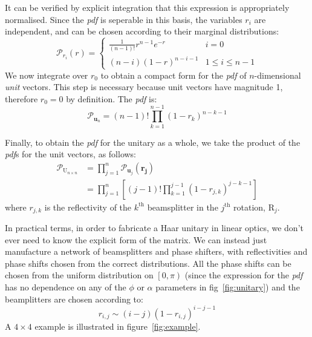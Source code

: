 \documentclass[aps,prl,twocolumn]{revtex4}
\renewcommand{\vec}[1]{\mathbf{#1}}
\newcommand{\mat}[1]{\mathrm{#1}}
\newcommand{\by}{\times}
\newcommand{\of}[1]{\!\left(#1\right)}
\newcommand{\pdf}{{\it pdf}}
\newcommand{\prob}[1]{\mathcal{#1}}
\begin{document}
It can be verified by explicit integration that this expression is appropriately
normalised. Since the \pdf{ } is seperable in this basis, the variables \( r_i
\) are independent, and can be chosen according to their marginal distributions:
\begin{equation}
  \prob{P}_{r_i} \of{ r } = \left\{ \begin{matrix}
    \frac{1}{ \left( n-1 \right)! } r^{n-1} e^{-r} & i=0 \\
    \left( n-i \right) \left( 1-r \right)^{n-i-1} & 1 \leq i \leq n-1
  \end{matrix} \right.
\end{equation}
We now integrate over \(r_{0}\) to obtain a compact form for the \pdf{ } of
\(n\)-dimensional \emph{unit} vectors. This step is necessary because unit
vectors have magnitude 1, therefore \(r_0=0\) by definition. The \pdf{ } is:
\begin{equation}
  \prob{P}_{ \vec{u}_n } = \left( n-1 \right)! \prod_{k=1}^{n-1} \left( 1-r_k
  \right)^{n-k-1}
\end{equation}

Finally, to obtain the \pdf{ } for the unitary as a whole, we take the product
of the \pdf s for the unit vectors, as follows:
\begin{align*}
  \prob{P}_{\mat{U}_{n \by n}} &= \prod_{j=1}^{n} \prob{P}_{\vec{u}_j}
  \of{\vec{r_j}} \\
  &= \prod_{j=1}^{n} \left[ \left( j-1 \right)! \prod_{k=1}^{j-1} \left(
  1-r_{j,k} \right)^{j-k-1} \right]
\end{align*}
where \( r_{j,k} \) is the reflectivity of the \( k^{\text{th}} \) beamsplitter
in the \( j^{\text{th}} \) rotation, \( \mat{R}_j \).

In practical terms, in order to fabricate a Haar unitary in linear optics, we
don't ever need to know the explicit form of the matrix. We can instead just
manufacture a network of beamsplitters and phase shifters, with reflectivities
and phase shifts chosen from the correct distributions. All the phase shifts can
be chosen from the uniform distribution on \( \left[ 0,\pi \right) \) (since the
expression for the \pdf{ }has no dependence on any of the \(\phi\) or \(\alpha\)
parameters in fig~\ref{fig:unitary}) and the
beamplitters are chosen according to:
\begin{equation}
  r_{i,j} \sim \left( i-j \right) \left( 1-r_{i,j} \right)^{i-j-1}
\end{equation}
A \( 4 \by 4 \) example is illustrated in figure~\ref{fig:example}.

\end{document}
